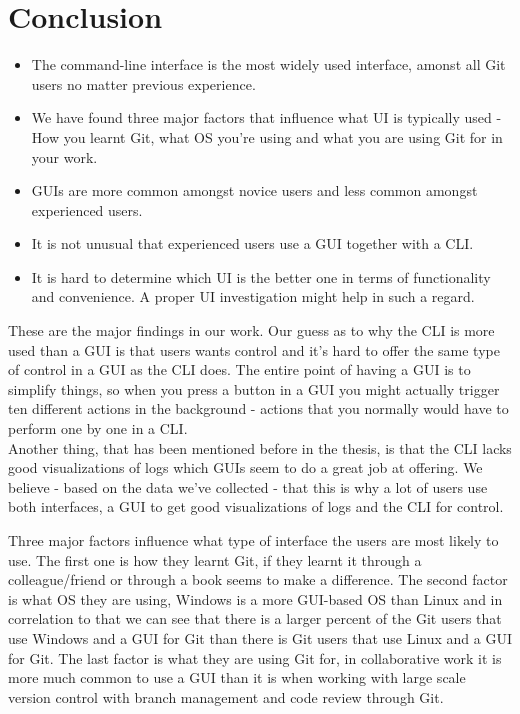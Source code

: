 \documentclass[a4paper,oneside]{bth} %
\begin{document}
		
		\chapter{Conclusion}
		\begin{itemize}
			\item The command-line interface is the most widely used interface, amonst all Git users no matter previous experience.
			\item We have found three major factors that influence what UI is typically used - How you learnt Git, what OS you're using and what you are using Git for in your work.
			\item GUIs are more common amongst novice users and less common amongst experienced users.
			\item It is not unusual that experienced users use a GUI together with a CLI.
			\item It is hard to determine which UI is the better one in terms of functionality and convenience. A proper UI investigation might help in such a regard.
		\end{itemize}
		
		These are the major findings in our work.
		Our guess as to why the CLI is more used than a GUI is that users wants control and it's hard to offer the same type of control in a GUI as the CLI does.
		The entire point of having a GUI is to simplify things, so when you press a button in a GUI you might actually trigger ten different actions in the background - actions that you normally would have to perform one by one in a CLI.\\
		Another thing, that has been mentioned before in the thesis, is that the CLI lacks good visualizations of logs which GUIs seem to do a great job at offering.
		We believe - based on the data we've collected - that this is why a lot of users use both interfaces, a GUI to get good visualizations of logs and the CLI for control.
		
		Three major factors influence what type of interface the users are most likely to use. The first one is how they learnt Git, if they learnt it through a colleague/friend or through a book seems to make a difference. The second factor is what OS they are using, Windows is a more GUI-based OS than Linux and in correlation to that we can see that there is a larger percent of the Git users that use Windows and a GUI for Git than there is Git users that use Linux and a GUI for Git.
		The last factor is what they are using Git for, in collaborative work it is more much common to use a GUI than it is when working with large scale version control with branch management and code review through Git.
		
\end{document}
